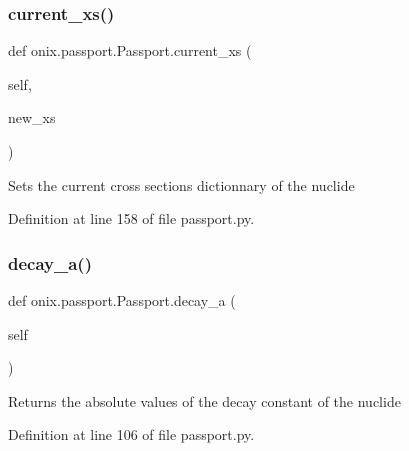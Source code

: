 \subsubsection{\texorpdfstring{current\+\_\+xs()}{current\_xs()}\hspace{0.1cm}{\footnotesize\ttfamily [2/2]}}
{\footnotesize\ttfamily def onix.\+passport.\+Passport.\+current\+\_\+xs (\begin{DoxyParamCaption}\item[{}]{self,  }\item[{}]{new\+\_\+xs }\end{DoxyParamCaption})}

\begin{DoxyVerb}Sets the current cross sections dictionnary of the nuclide\end{DoxyVerb}
 

Definition at line 158 of file passport.\+py.

\mbox{\label{classonix_1_1passport_1_1Passport_a297a0572f03d763e007dc656d32dc829}} 
\subsubsection{\texorpdfstring{decay\+\_\+a()}{decay\_a()}\hspace{0.1cm}{\footnotesize\ttfamily [1/2]}}
{\footnotesize\ttfamily def onix.\+passport.\+Passport.\+decay\+\_\+a (\begin{DoxyParamCaption}\item[{}]{self }\end{DoxyParamCaption})}

\begin{DoxyVerb}Returns the absolute values of the decay constant of the nuclide\end{DoxyVerb}
 

Definition at line 106 of file passport.\+py.

\mbox{\label{classonix_1_1passport_1_1Passport_ae7d741a23befd16c05786249ce3ce568}} 
